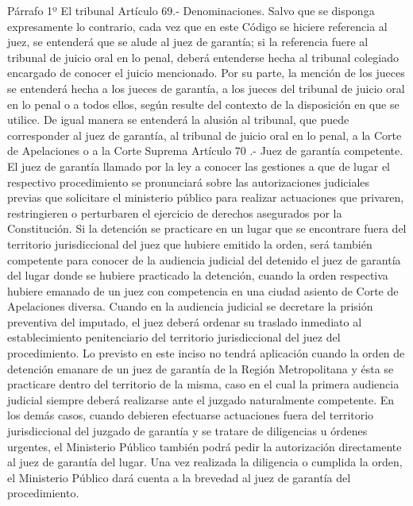     Párrafo 1º El tribunal
    Artículo 69.- Denominaciones. Salvo que se disponga expresamente lo contrario, cada vez que en este Código se hiciere referencia al juez, se entenderá que se alude al juez de garantía; si la referencia fuere al tribunal de juicio oral en lo penal, deberá entenderse hecha al tribunal colegiado encargado de conocer el juicio mencionado.
    Por su parte, la mención de los jueces se entenderá hecha a los jueces de garantía, a los jueces del tribunal de juicio oral en lo penal o a todos ellos, según resulte del contexto de la disposición en que se utilice. De igual manera se entenderá la alusión al tribunal, que puede corresponder al juez de garantía, al tribunal de juicio oral en lo penal, a la Corte de Apelaciones o a la Corte Suprema
    Artículo 70 .- Juez de garantía competente. El juez de garantía llamado por la ley a conocer las gestiones a que de lugar el respectivo procedimiento se pronunciará sobre las autorizaciones judiciales previas que solicitare el ministerio público para realizar actuaciones que privaren, restringieren o perturbaren el ejercicio de derechos asegurados por la Constitución.
    Si la detención se practicare en un lugar que se encontrare fuera del territorio jurisdiccional del juez que hubiere emitido la orden, será también competente para conocer de la audiencia judicial del detenido el juez de garantía del lugar donde se hubiere practicado la detención, cuando la orden respectiva hubiere emanado de un juez con competencia en una ciudad asiento de Corte de Apelaciones diversa. Cuando en la audiencia judicial se decretare la prisión preventiva del imputado, el juez deberá ordenar su traslado inmediato al establecimiento penitenciario del territorio jurisdiccional del juez del procedimiento. Lo previsto en este inciso no tendrá aplicación cuando la orden de detención emanare de un juez de garantía de la Región Metropolitana y ésta se practicare dentro del territorio de la misma, caso en el cual la primera audiencia judicial siempre deberá realizarse ante el juzgado naturalmente competente.
    En los demás casos, cuando debieren efectuarse actuaciones fuera del territorio jurisdiccional del juzgado de garantía y se tratare de diligencias u órdenes urgentes, el Ministerio Público también podrá pedir la autorización directamente al juez de garantía del lugar. Una vez realizada la diligencia o cumplida la orden, el Ministerio Público dará cuenta a la brevedad al juez de garantía del procedimiento.

